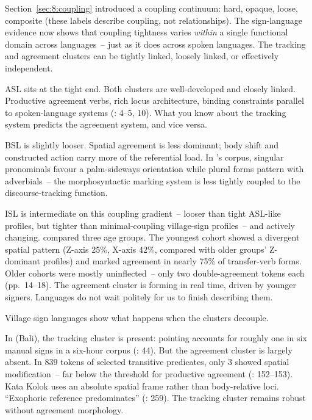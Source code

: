 Section~\ref{sec:8:coupling} introduced a coupling continuum: hard, opaque, loose, composite (these labels describe coupling, not relationships). The sign-language evidence now shows that coupling tightness varies \textit{within} a single functional domain across languages~-- just as it does across spoken languages. The tracking and agreement clusters can be tightly linked, loosely linked, or effectively independent.

ASL sits at the tight end. Both clusters are well-developed and closely linked. Productive agreement verbs, rich locus architecture, binding constraints parallel to spoken-language systems (\citealt{schlenker2017}: 4--5, 10). What you know about the tracking system predicts the agreement system, and vice versa.

BSL is slightly looser. Spatial agreement is less dominant; body shift and constructed action carry more of the referential load. In \textcite[239]{cormier2013}'s corpus, singular pronominals favour a palm-sideways orientation while plural forms pattern with adverbials~-- the morphosyntactic marking system is less tightly coupled to the discourse-tracking function.

ISL is intermediate on this coupling gradient~-- looser than tight ASL-like profiles, but tighter than minimal-coupling village-sign profiles~-- and actively changing. \textcite{padden2010} compared three age groups. The youngest cohort showed a divergent spatial pattern (Z-axis 25\%, X-axis 42\%, compared with older groups' Z-dominant profiles) and marked agreement in nearly 75\% of transfer-verb forms. Older cohorts were mostly uninflected~-- only two double-agreement tokens each (pp.~14--18). The agreement cluster is forming in real time, driven by younger signers. Languages do not wait politely for us to finish describing them.

Village sign languages show what happens when the clusters decouple.

In  (Bali), the tracking cluster is present: pointing accounts for roughly one in six manual signs in a six-hour corpus (\citealt{devos2012}: 44). But the agreement cluster is largely absent. In 839 tokens of selected transitive predicates, only 3 showed spatial modification~-- far below the threshold for productive agreement (\citealt{devos2012}: 152--153). Kata Kolok uses an absolute spatial frame rather than body-relative loci. \enquote{Exophoric reference predominates} (\citealt{devos2012}: 259). The tracking cluster remains robust without agreement morphology.

